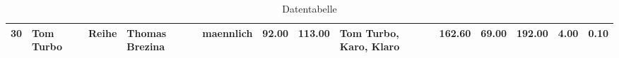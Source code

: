 \begin{sidewaystable}[ht]
\begin{center}
{\begin{tabular}{rllllrrlrrrrr}
  30 & Tom Turbo                                                                                                                                                                                                                                                       & Reihe & Thomas Brezina                                                                                                                                                                                                                                                  & maennlich & 92.00 & 113.00 & Tom Turbo, Karo, Klaro                                                                                                                                                                                                                                          & 162.60 & 69.00 & 192.00 & 4.00 & 0.10 \\ 
   \hline
\end{tabular}
}
\caption{Datentabelle}
\label{merkmale}
\end{center}
\end{sidewaystable}%
